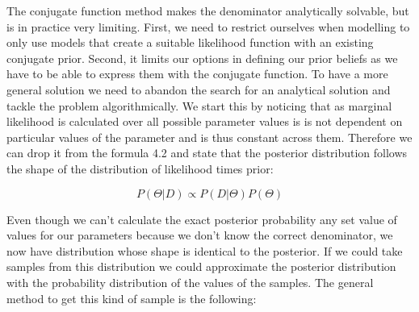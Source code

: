 \documentclass[12pt,a4paper,leqno]{report}
\theoremstyle{plain}
\theoremstyle{definition}
\theoremstyle{remark}
\begin{document}
The conjugate function method makes the denominator analytically solvable, but is in
practice very limiting. First, we need to restrict ourselves when modelling to only use
models that create a suitable likelihood function with an existing conjugate prior.
Second, it limits our options in defining our prior beliefs as we have to be able to
express them with the conjugate function. To have a more general solution we need to
abandon the search for an analytical solution and tackle the problem algorithmically. We
start this by noticing that as marginal likelihood is calculated over all possible
parameter values is is not dependent on particular values of the parameter and is thus
constant across them. Therefore we can drop it from the formula 4.2 and state that the
posterior distribution follows the shape of the distribution of likelihood times prior:

\begin{def}\label{bayespropto}
    \begin{equation}
        P(\Theta|D) \propto P(D|\Theta)P(\Theta)
    \end{equation}
\end{def}

Even though we can't calculate the exact posterior probability any set value of values
for our parameters because we don't know the correct denominator, we now have
distribution whose shape is identical to the posterior. If we could take samples from
this distribution we could approximate the posterior distribution with the probability
distribution of the values of the samples. The general method to get this kind of sample
is the following:
\end{document}
